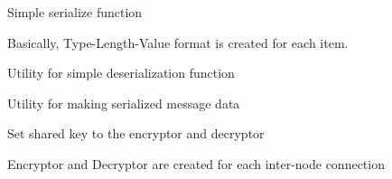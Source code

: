 \documentclass[letterpaper,10pt,english]{sphinxmanual}
\begin{document}
\begin{fulllineitems}
\label{\detokenize{bbc1.core.message_key_types:bbc1.core.message_key_types.make_binary}}
Simple serialize function

Basically, Type-Length-Value format is created for each item.

\end{fulllineitems}


\begin{fulllineitems}
\label{\detokenize{bbc1.core.message_key_types:bbc1.core.message_key_types.make_dictionary_from_TLV_format}}
Utility for simple deserialization function

\end{fulllineitems}


\begin{fulllineitems}
\label{\detokenize{bbc1.core.message_key_types:bbc1.core.message_key_types.make_message}}
Utility for making serialized message data

\end{fulllineitems}


\begin{fulllineitems}
\label{\detokenize{bbc1.core.message_key_types:bbc1.core.message_key_types.set_cipher}}
Set shared key to the encryptor and decryptor

Encryptor and Decryptor are created for each inter-node connection

\end{fulllineitems}
\end{document}

